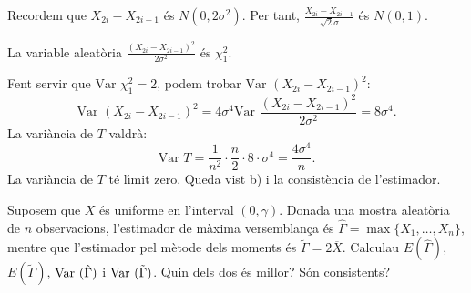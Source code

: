 {Recordem que $X_{2i}-X_{2i-1}$ \'es $N(0,2\sigma^2)$. Per tant, 
$\frac{X_{2i}-X_{2i-1}}{\sqrt{2}\sigma}$ \'es $N(0,1).$

La variable aleat\`oria $\frac{{(X_{2i}-X_{2i-1})}^2}{2 
\sigma^2}$ \'es $\chi_1^2$.

Fent servir que $\mbox{Var } \chi_1^2 =2$, podem trobar \mbox{$\mbox{Var 
} {(X_{2i}-X_{2 i-1})}^2$:}
\[
\mbox{Var } {(X_{2i}-X_{2 i-1})}^2 = 4 \sigma^4 \mbox{Var } \frac{{(X_{2i}-X_{2i-1})}^2}{2 
\sigma^2} = 8 \sigma^4.
\]
La vari\`ancia de $T$ valdr\`a:
\[
\mbox{Var }T =\frac{1}{n^2}\cdot\frac{n}{2}\cdot 8\cdot\sigma^4 = \frac{4\sigma^4}{n}.
\]
La vari\`ancia de $T$ t\'e l\'{\i}mit zero. Queda vist b) i la consist\`encia de 
l'estimador.}

\begin{probres}
{Suposem que $X$ \'es uniforme en l'interval $(0,\gamma)$. Donada una
mostra aleat\`oria de $n$ observacions, l'estimador de m\`axima versemblan\c{c}a 
\'es \hbox{$\hat{\Gamma}=\max\{X_1,\ldots,X_n\}$,} mentre que l'estimador pel
m\`etode dels moments \'es $\tilde{\Gamma}=2\overline{X}$. Calculau
$E(\hat{\Gamma})$, $E(\tilde{\Gamma})$, $\hbox{Var }(\hat{\Gamma})$ i $\hbox{Var
}(\tilde{\Gamma})$. Quin dels dos \'es millor? S\'on consistents?}
\end{probres}

